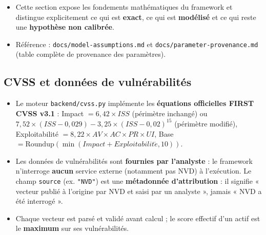 \documentclass[12pt,a4paper]{article}
\newcommand{\forcereset}[1]{%
    \needspace{#1\baselineskip}%
}
\begin{document}
\begin{itemize}[leftmargin=1.2cm, itemsep=0.2\baselineskip]
    \item Cette section expose les fondements mathématiques du framework et distingue explicitement ce qui est \textbf{exact}, ce qui est \textbf{modélisé} et ce qui reste une \textbf{hypothèse non calibrée}.
    \item Référence : \texttt{docs/model-assumptions.md} et \texttt{docs/parameter-provenance.md} (table complète de provenance des paramètres).
\end{itemize}

\subsection{CVSS et données de vulnérabilités}
\forcereset{4}
\begin{itemize}[leftmargin=1.2cm, itemsep=0.2\baselineskip]
    \item Le moteur \texttt{backend/cvss.py} implémente les \textbf{équations officielles FIRST CVSS v3.1} : Impact $= 6{,}42\times ISS$ (périmètre inchangé) ou $7{,}52\times(ISS-0{,}029)-3{,}25\times(ISS-0{,}02)^{15}$ (périmètre modifié), Exploitabilité $= 8{,}22\times AV\times AC\times PR\times UI$, Base $=\mathrm{Roundup}(\min(Impact+Exploitabilit\acute{e}, 10))$.
    \item Les données de vulnérabilités sont \textbf{fournies par l'analyste} : le framework n'interroge \textbf{aucun} service externe (notamment pas NVD) à l'exécution. Le champ \texttt{source} (ex. \texttt{"NVD"}) est une \textbf{métadonnée d'attribution} : il signifie « vecteur publié à l'origine par NVD et saisi par un analyste », jamais « NVD a été interrogé ».
    \item Chaque vecteur est parsé et validé avant calcul ; le score effectif d'un actif est le \textbf{maximum} sur ses vulnérabilités.
\end{itemize}
\end{document}
